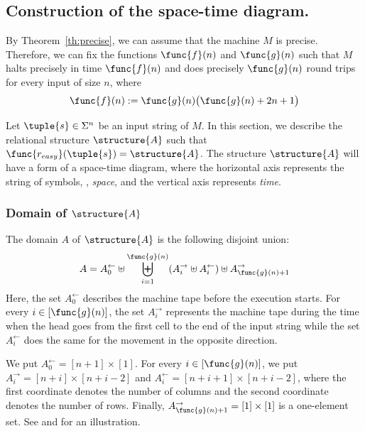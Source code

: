 \documentclass{lmcs}
\begin{document}
\medskip




\subsection{Construction of the space-time diagram.}\label{subsection:space_time_diagram}

By Theorem~\ref{th:precise}, we can assume that the machine $M$ is precise. Therefore, we can fix the functions $\func{f}(n)$ and $\func{g}(n)$ such that $M$ halts precisely in time $\func{f}(n)$ and does precisely $\func{g}(n)$ round trips for every input of size $n$, where
\begin{equation*}
\func{f}(n) := \func{g}(n)\bigl(\func{g}(n)+2n+1\bigr)
\end{equation*} 


Let $\tuple{s}\in\Sigma^n$ be an input string of $M$. In this section, we describe the relational structure $\structure{A}$ such that $\func{r_{easy}}(\tuple{s}) = \structure{A}$. 
The structure $\structure{A}$ will have a form of a space-time diagram, where the horizontal axis represents the string of symbols, \ie, \emph{space}, and the vertical axis represents \emph{time}.

\subsubsection*{Domain of $\structure{A}$}
The domain $A$ of $\structure{A}$ is the following disjoint union:
\begin{equation}
A = A_0^\leftarrow\uplus \biguplus_{i=1}^{\func{g}(n)}(A_i^\rightarrow\uplus A_i^\leftarrow) \uplus A_{\func{g}(n)+1}^\rightarrow
\end{equation}
Here, the set $A_0^\leftarrow$ describes the machine tape before the execution starts.
For every $i\in[\func{g}(n)]$, the set $A_i^\rightarrow$ represents the machine tape during the time when the head goes from the first cell to the end of the input string while the set $A_i^\leftarrow$ does the same for the movement in the opposite direction.

We put $A_0^\leftarrow = [n+1]\times[1]$.
For every $i\in[\func{g}(n)]$, we put $A_i^\rightarrow = [n+i]\times[n+i-2]$ and $A_i^\leftarrow = [n+i+1]\times[n+i-2]$, where the first coordinate denotes the number of columns and the second coordinate denotes the number of rows.
Finally, $A_{\func{g}(n)+1}^\rightarrow = [1]\times[1]$ is a one-element set.
See  and  for an illustration.
\end{document}
